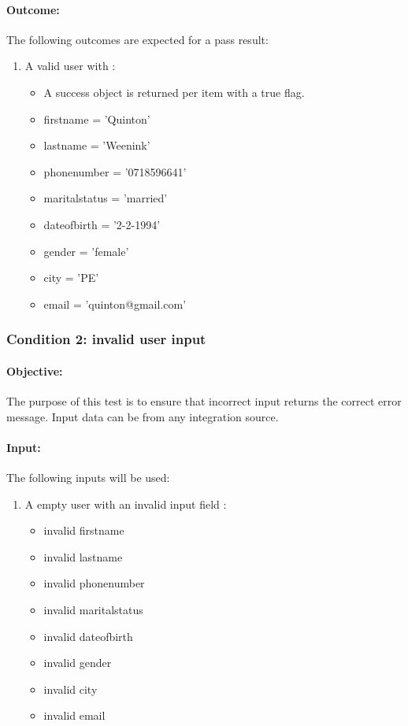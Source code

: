 \documentclass{article}
\begin{document}
\paragraph{Outcome:} The following outcomes are expected for a pass result:
\begin{enumerate}
\item A valid user with :
\begin{itemize}
	\item A success object is returned per item with a true flag.
	\item firstname = 'Quinton'
	\item lastname = 'Weenink'
	\item phonenumber = '0718596641'
	\item maritalstatus = 'married'
	\item dateofbirth = '2-2-1994'
	\item gender = 'female'
	\item city = 'PE'
	\item email = 'quinton@gmail.com'

\end{itemize}
\end{enumerate}

\subsubsection{Condition 2: invalid user input }
\paragraph{Objective:} The purpose of this test is to ensure that incorrect input returns the correct error message. Input data can be from any integration source.
\paragraph{Input:} The following inputs will be used:

\begin{enumerate}
	\item A empty user with an invalid input field :
	\begin{itemize}
  	\item invalid firstname
    \item invalid lastname
    \item invalid phonenumber
    \item invalid maritalstatus
    \item invalid dateofbirth
    \item invalid gender
    \item invalid city 
    \item invalid email
    \end{itemize}	  
\end{enumerate}
\end{document}
